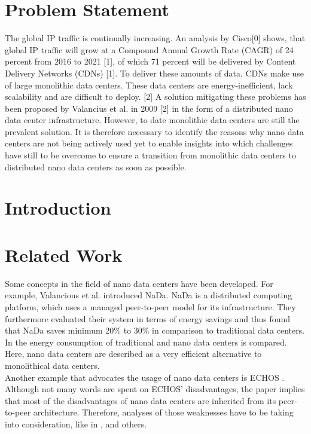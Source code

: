 \documentclass[sigchi-a, authorversion]{acmart}
\begin{document}
\section{Problem Statement}
The global IP traffic is continually increasing. An analysis by Cisco[0] shows, that global IP traffic will grow at a Compound Annual Growth Rate (CAGR) of 24 percent from 2016 to 2021 [1], of which 71 percent will be delivered by Content Delivery Networks (CDNs) [1]. To deliver these amounts of data, CDNs make use of large monolithic data centers. These data centers are energy-inefficient, lack scalability and are difficult to deploy. [2] A solution mitigating these problems has been proposed by Valancius et al. in 2009 [2] in the form of a distributed nano data center infrastructure. However, to date monolithic data centers are still the prevalent solution. It is therefore necessary to identify the reasons why nano data centers are not being actively used yet to enable insights into which challenges have still to be overcome to ensure a transition from monolithic data centers to distributed nano data centers as soon as possible.

\section{Introduction} %

\section{Related Work} %
Some concepts in the field of nano data centers have been developed. For example, Valancious et al. \cite{DBLP:conf/conext/ValanciusLMDR09} introduced NaDa. NaDa is a distributed computing platform, which uses a managed peer-to-peer model for its infrastructure. They furthermore evaluated their system in terms of energy savings and thus found that NaDa saves minimum 20\% to 30\% in comparison to traditional data centers. \\
In \cite{DBLP:journals/sigmetrics/JalaliAVHAT14} the energy consumption of traditional and nano data centers is compared. Here, nano data centers are described as a very efficient alternative to monolithical data centers.\\
Another example that advocates the usage of nano data centers is ECHOS \cite{Laoutaris:2008:EEC:1341431.1341442}. Although not many words are spent on ECHOS' disadvantages, the paper implies that most of the disadvantages of nano data centers are inherited from its peer-to-peer architecture. Therefore, analyses of those weaknesses have to be taking into consideration, like in \cite{Dumitriu:2005:DoS}, \cite{Mhapasekar:2011:anonymity} and others.
\\
\end{document}
